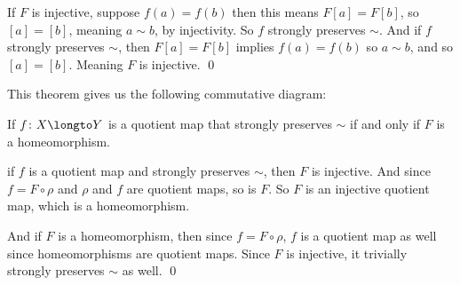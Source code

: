If $F$ is injective, suppose $f(a)=f(b)$ then this means $F[a]=F[b]$, so $[a]=[b]$, meaning $a\sim b$, by injectivity.
So $f$ strongly preserves $\sim$.
And if $f$ strongly preserves $\sim$, then $F[a]=F[b]$ implies $f(a)=f(b)$ so $a\sim b$, and so $[a]=[b]$.
Meaning $F$ is injective.
\qed

This theorem gives us the following commutative diagram:

\medskip
\centerline{
\def\diagrowheight{1cm}
\def\diagcolwidth{1cm}
}
\medskip

\bprop

    If $f\colon X\longto Y$ is a quotient map that strongly preserves $\sim$ if and only if $F$ is a homeomorphism.

\eprop

\Proof if $f$ is a quotient map and strongly preserves $\sim$, then $F$ is injective.
And since $f=F\circ\rho$ and $\rho$ and $f$ are quotient maps, so is $F$.
So $F$ is an injective quotient map, which is a homeomorphism.

And if $F$ is a homeomorphism, then since $f=F\circ\rho$, $f$ is a quotient map as well since homeomorphisms are quotient maps.
Since $F$ is injective, it trivially strongly preserves $\sim$ as well.
\qed

